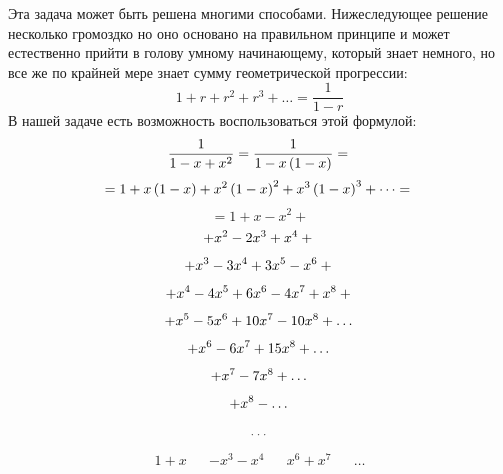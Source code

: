 \documentclass[a4paper,12pt]{article} %
\begin{document}
	Эта задача может быть решена многими способами. Нижеследующее решение несколько громоздко но оно основано на правильном принципе и может естественно прийти в голову умному начинающему, который знает немного, но все же по крайней мере знает сумму геометрической прогрессии:
	$$1 + r + r^2 + r^3 + \dots = \frac{1}{1 - r}$$
	В нашей задаче есть возможность воспользоваться этой формулой:
	\begin{equation*}
		\frac{1}{1-x+x^2} = 
		\frac{1}{1 - x \left(1 - x \right)} = \\
	\end{equation*}
	\begin{equation*}
		= 1 + x \left(1 - x \right) +
		x^2 \left(1 - x \right)^2 +
		x^3 \left(1 - x \right)^3 + \dots = \\
	\end{equation*}
	\begin{equation*}
		= 1 + x - x^2 +
	\end{equation*}
	\begin{equation*}
		+ x^2 - 2x^3 + x^4 + \\
	\end{equation*}
	\begin{equation*}
		+ x^3 - 3x^4 + 3x^5 - x^6 + \\
	\end{equation*}
	\begin{equation*}
		+ x^4 - 4x^5 + 6x^6 - 4x^7 + x^8 + \\
	\end{equation*}
	\begin{equation*}
		+ x^5 - 5x^6 + 10x^7 - 10x^8 + \dots \\
	\end{equation*}
	\begin{equation*}
		+ x^6 - 6x^7 + 15x^8 + \dots \\
	\end{equation*}
	\begin{equation*}
		+ x^7 - 7x^8 + \dots \\
	\end{equation*}
	\begin{equation*}
		+ x^8 - \dots \\
	\end{equation*}
	\begin{equation*}
		\dots \\
	\end{equation*}
	\begin{align*}
		1 + x & & -x^3 -x^4 & & x^6 + x^7 & & \dots
	\end{align*}
	\newpage
\end{document}
